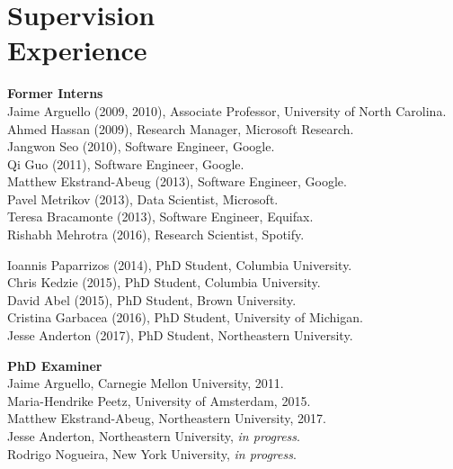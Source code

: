 \documentclass{article}
\begin{document}
\section{Supervision\\Experience}\noindent\textbf{Former Interns}\\
Jaime Arguello (2009, 2010), Associate Professor, University of North Carolina.\\
Ahmed Hassan (2009), Research Manager, Microsoft Research.\\
Jangwon Seo (2010), Software Engineer, Google.\\
Qi Guo (2011), Software Engineer, Google.\\
Matthew Ekstrand-Abeug (2013), Software Engineer, Google.\\
Pavel Metrikov (2013), Data Scientist, Microsoft.\\
Teresa Bracamonte (2013), Software Engineer, Equifax.\\
Rishabh Mehrotra (2016),  Research Scientist, Spotify.\\

\vspace{\baselineskip}

\noindent Ioannis Paparrizos (2014), PhD Student, Columbia University.\\
Chris Kedzie (2015), PhD Student,  Columbia University.\\
David Abel (2015), PhD Student, Brown University.\\
Cristina Garbacea (2016), PhD Student, University of Michigan.\\
Jesse Anderton (2017), PhD Student,  Northeastern University.
	
\vspace{\baselineskip}
\noindent\textbf{PhD Examiner}\\
Jaime Arguello, Carnegie Mellon University, 2011.\\
Maria-Hendrike Peetz, University of Amsterdam, 2015.\\
Matthew Ekstrand-Abeug, Northeastern University, 2017.\\
Jesse Anderton, Northeastern University, \emph{in progress}.\\
Rodrigo Nogueira, New York University, \emph{in progress}.

\setlength{\leftmargini}{0em}
\end{document}
